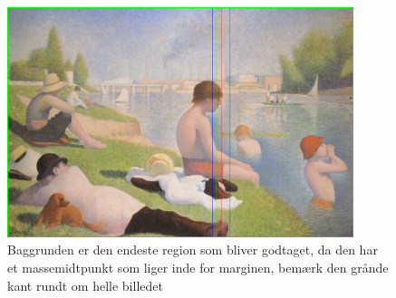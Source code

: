 \begin{figure}[h!!]
	\begin{center}
		\includegraphics[width=0.9\textwidth,angle=0]{afsnit/afprovning/billeder/udvidet_losning/udvidet_dreng.png}
	\end{center}
	\caption[]{Baggrunden er den endeste region som bliver godtaget, da den har et massemidtpunkt som liger inde for marginen, bemærk den grånde kant rundt om helle billedet}
	\label{udvidet_virker2}
\end{figure}

